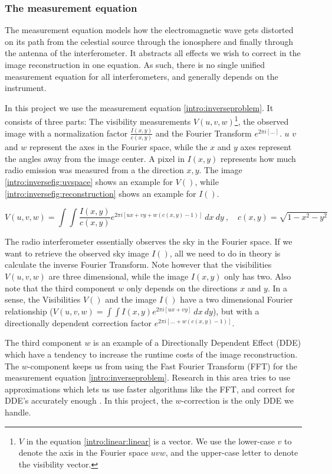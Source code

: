 \subsubsection{The measurement equation}
The measurement equation models how the electromagnetic wave gets distorted on its path from the celestial source through the ionosphere and finally through the antenna of the interferometer\cite{smirnov2011revisiting1}. It abstracts all effects we wish to correct in the image reconstruction in one equation. As such, there is no single unified measurement equation for all interferometers, and generally depends on the instrument.

In this project we use the measurement equation \eqref{intro:inverseproblem}. It consists of three parts: The visibility measurements $V(u,v,w)$\footnote{$V$ in the equation \eqref{intro:linear:linear} is a vector. We use the lower-case $v$ to denote the axis in the Fourier space $uvw$, and the upper-case letter to denote the visibility vector.}, the observed image with a normalization factor $\frac{I(x, y)}{c(x, y)}$ and the Fourier Transform $e^{2 \pi i [\ldots]}$. $u$ $v$ and $w$ represent the axes in the Fourier space, while the $x$ and $y$ axes represent the angles away from the image center. A pixel in $I(x,y)$ represents how much radio emission was measured from a the direction $x,y$. The image \ref{intro:inversefig:uvspace} shows an example for $V()$, while \ref{intro:inversefig:reconstruction} shows an example for $I()$.

\begin{equation}\label{intro:inverseproblem}
V(u, v, w) = \int\int  \frac{I(x, y)}{c(x, y)}  e^{2 \pi i [ux+vy+ w(c(x, y) - 1)]} \: dx \: dy \:,  \quad c(x,y) = \sqrt{1 - x^2 - y ^2}
\end{equation}

The radio interferometer essentially observes the sky in the Fourier space. If we want to retrieve the observed sky image $I()$, all we need to do in theory is calculate the inverse Fourier Transform. Note however that the visibilities $V(u,v,w)$ are three dimensional, while the image $I(x,y)$ only has two. Also note that the third component $w$ only depends on the directions $x$ and $y$. In a sense, the Visibilities $V()$ and the image $I()$ have a two dimensional Fourier relationship ($V(u,v,w) = \int\int I(x,y) e^{2 \pi i [ux+vy]} \: dx \: dy$), but with a directionally dependent correction factor $e^{2 \pi i [\ldots +w(c(x, y) - 1)]}$. 

The third component $w$ is an example of a Directionally Dependent Effect (DDE) which have a tendency to increase the runtime costs of the image reconstruction. The $w$-component keeps us from using the Fast Fourier Transform (FFT) for the measurement equation \eqref{intro:inverseproblem}. Research in this area tries to use approximations which lets us use faster algorithms like the FFT, and correct for DDE's accurately enough \cite{veenboer2017image, offringa2014wsclean, pratley2018fast}. In this project, the $w$-correction is the only DDE we handle.


